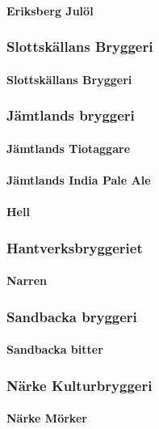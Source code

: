 \documentclass[11pt]{article}
\begin{document}
\paragraph{Eriksberg Julöl}
\label{sec:orgf2b35cd}
\subsubsection{Slottskällans Bryggeri}
\label{sec:orgdab1ac3}
\paragraph{Slottskällans Bryggeri}
\label{sec:org91a7c10}
\subsubsection{Jämtlands bryggeri}
\label{sec:org67ded0d}
\paragraph{Jämtlands Tiotaggare}
\label{sec:orgc15c658}
\paragraph{Jämtlands India Pale Ale}
\label{sec:orgd72f3e2}
\paragraph{Hell}
\label{sec:org907f344}
\subsubsection{Hantverksbryggeriet}
\label{sec:org6594cf9}
\paragraph{Narren}
\label{sec:org62be123}
\subsubsection{Sandbacka bryggeri}
\label{sec:orgfcc577f}
\paragraph{Sandbacka bitter}
\label{sec:orgf40316b}
\subsubsection{Närke Kulturbryggeri}
\label{sec:org38a1b5a}
\paragraph{Närke Mörker}
\label{sec:orgcf1304b}
\end{document}
